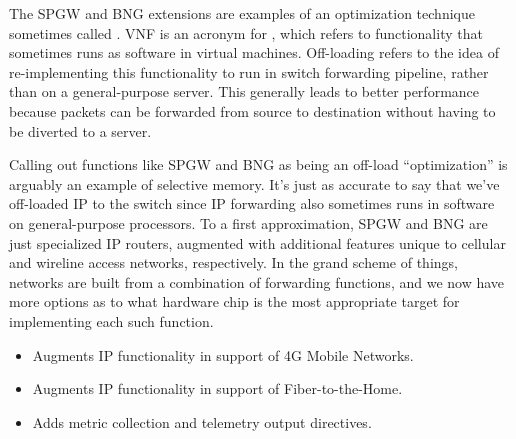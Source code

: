 \documentclass[letterpaper,11pt,english]{sphinxmanual}
\begin{document}
\begin{sphinxShadowBox}

The SPGW and BNG extensions are examples of an optimization
technique sometimes called . VNF is an acronym
for , which refers to functionality that
sometimes runs as software in virtual machines. Off-loading refers
to the idea of re-implementing this functionality to run in switch
forwarding pipeline, rather than on a general-purpose server. This
generally leads to better performance because packets can be
forwarded from source to destination without having to be diverted
to a server.

Calling out functions like SPGW and BNG as being an off-load
“optimization” is arguably an example of selective memory. It’s
just as accurate to say that we’ve off-loaded IP to the switch
since IP forwarding also sometimes runs in software on
general-purpose processors. To a first approximation, SPGW and BNG
are just specialized IP routers, augmented with additional
features unique to cellular and wireline access networks,
respectively. In the grand scheme of things, networks are built
from a combination of forwarding functions, and we now have more
options as to what hardware chip is the most appropriate target
for implementing each such function.
\end{sphinxShadowBox}
\begin{itemize}
\item {} 
 Augments IP functionality in
support of 4G Mobile Networks.

\item {} 
 Augments IP functionality in
support of Fiber-to-the-Home.

\item {} 
 Adds metric collection and
telemetry output directives.

\end{itemize}
\end{document}

